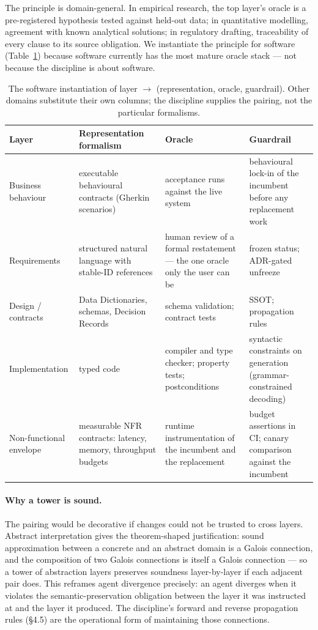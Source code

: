 \documentclass[11pt,a4paper,twocolumn]{article}
\begin{document}
The principle is domain-general. In empirical research, the top
layer's oracle is a pre-registered hypothesis tested against
held-out data; in quantitative modelling, agreement with known
analytical solutions; in regulatory drafting, traceability of
every clause to its source obligation. We instantiate the
principle for software (Table~\ref{tab:oracles}) because software
currently has the most mature oracle stack --- not because the
discipline is about software.

\begin{table}[t]
\centering
\small
\begin{tabular}{p{2.6cm} p{4.2cm} p{4.3cm} p{4.3cm}}
\toprule
\textbf{Layer} & \textbf{Representation formalism} & \textbf{Oracle} & \textbf{Guardrail} \\
\midrule
Business behaviour & executable behavioural contracts (Gherkin scenarios) & acceptance runs against the live system & behavioural lock-in of the incumbent before any replacement work \\
Requirements & structured natural language with stable-ID references & human review of a formal restatement --- the one oracle only the user can be & frozen status; ADR-gated unfreeze \\
Design / contracts & Data Dictionaries, schemas, Decision Records & schema validation; contract tests & SSOT; propagation rules \\
Implementation & typed code & compiler and type checker; property tests; postconditions & syntactic constraints on generation (grammar-constrained decoding) \\
Non-functional envelope & measurable NFR contracts: latency, memory, throughput budgets & runtime instrumentation of the incumbent and the replacement & budget assertions in CI; canary comparison against the incumbent \\
\bottomrule
\end{tabular}
\caption{The software instantiation of layer $\to$ (representation,
oracle, guardrail). Other domains substitute their own columns;
the discipline supplies the pairing, not the particular formalisms.}
\label{tab:oracles}
\end{table}

\paragraph{Why a tower is sound.} The pairing would be decorative
if changes could not be trusted to cross layers. Abstract
interpretation \citep{cousot1977abstract} gives the
theorem-shaped justification: sound approximation between a
concrete and an abstract domain is a Galois connection, and the
composition of two Galois connections is itself a Galois
connection --- so a tower of abstraction layers preserves
soundness layer-by-layer if each adjacent pair does. This
reframes agent divergence precisely: an agent diverges when it
violates the semantic-preservation obligation between the layer
it was instructed at and the layer it produced. The discipline's
forward and reverse propagation rules (\S4.5) are the operational
form of maintaining those connections.
\end{document}

